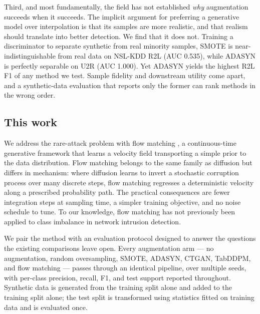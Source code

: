 \documentclass[11pt]{article}
\newcommand{\smoteDetectAUC}{0.535}   %
\newcommand{\adasynDetectAUC}{1.000}  %
\begin{document}
Third, and most fundamentally, the field has not established \emph{why}
augmentation succeeds when it succeeds. The implicit argument for preferring a
generative model over interpolation is that its samples are more realistic, and
that realism should translate into better detection. We find that it does not.
Training a discriminator to separate synthetic from real minority samples, SMOTE
is near-indistinguishable from real data on NSL-KDD R2L (AUC
\smoteDetectAUC{}), while ADASYN is perfectly separable on U2R (AUC
\adasynDetectAUC{}). Yet ADASYN yields the highest R2L F1 of any method we test.
Sample fidelity and downstream utility come apart, and a synthetic-data
evaluation that reports only the former can rank methods in the wrong order.

\subsection*{This work}

We address the rare-attack problem with flow matching
\cite{lipman2023flow}, a continuous-time generative framework that learns a
velocity field transporting a simple prior to the data distribution. Flow
matching belongs to the same family as diffusion but differs in mechanism: where
diffusion learns to invert a stochastic corruption process over many discrete
steps, flow matching regresses a deterministic velocity along a prescribed
probability path. The practical consequences are fewer integration steps at
sampling time, a simpler training objective, and no noise schedule to tune. To
our knowledge, flow matching has not previously been applied to class imbalance
in network intrusion detection.

We pair the method with an evaluation protocol designed to answer the questions
the existing comparisons leave open. Every augmentation arm --- no augmentation,
random oversampling, SMOTE, ADASYN, CTGAN, TabDDPM, and flow matching --- passes
through an identical pipeline, over multiple seeds, with per-class precision,
recall, F1, and test support reported throughout. Synthetic data is generated
from the training split alone and added to the training split alone; the test
split is transformed using statistics fitted on training data and is evaluated
once.
\end{document}
